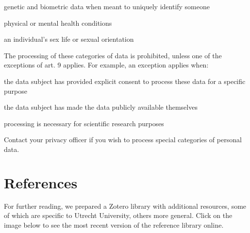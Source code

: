 \documentclass[
]{book}
\begin{document}
genetic and biometric data when meant to uniquely identify someone

physical or mental health conditions

an individual's sex life or sexual orientation

The processing of these categories of data is
prohibited, unless one of the exceptions of
art. 9 applies.
For example, an exception applies when:

the data subject has provided explicit consent to process these data for a specific purpose

the data subject has made the data publicly available themselves

processing is necessary for scientific research purposes

Contact your privacy officer if you wish to process special categories of personal data.

\hypertarget{references}{%
\chapter{References}\label{references}}

For further reading, we prepared a Zotero library with additional resources, some
of which are specific to Utrecht University, others more general. Click on the
image below to see the most recent version of the reference library online.

  
\end{document}
